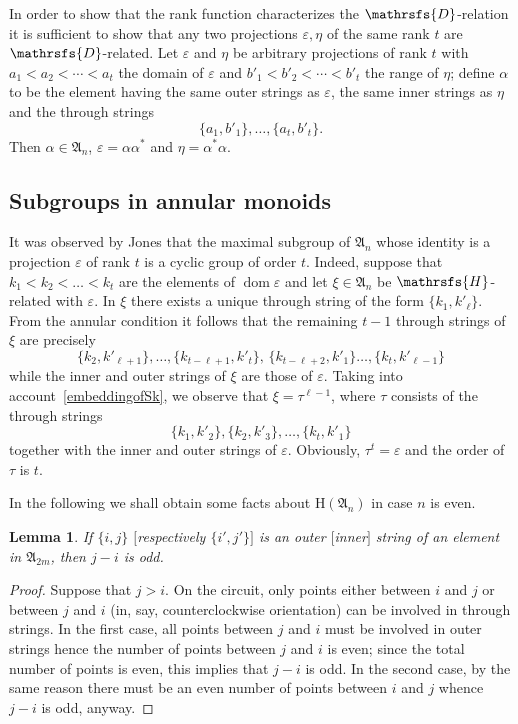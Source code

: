 \documentclass[11pt,reqno]{amsart}
\DeclareMathOperator{\dom}{dom} \DeclareMathOperator{\ran}{ran}
\numberwithin{equation}{section}
\newtheorem{Lemma}[Thm]{Lemma}
\theoremstyle{remark}
\def\Dc{\mathrsfs{D}}
\def\Hc{\mathrsfs{H}}
\def\al{\alpha}
\def\ep{\varepsilon}
\def\H{\mathrm H}
\def\A{\mathfrak{A}}
\begin{document}
In order to show that the rank function characterizes the
$\Dc$-relation it is sufficient to show that any two projections
$\ep, \eta$ of the same rank $t$ are $\Dc$-related. Let $\ep$ and
$\eta$ be arbitrary projections of rank $t$ with
$a_1<a_2<\cdots<a_t$  the domain of $\ep$ and
$b'_1<b'_2<\cdots<b'_t$ the range of $\eta$; define $\alpha$ to be
the element having the same outer strings as $\ep$, the same inner
strings as $\eta$ and the through strings
$$\{a_1,b'_1\},\dots,\{a_t,b'_t\}.$$
Then $\alpha\in \A_n$, $\ep=\al\al^*$ and $\eta=\al^*\al$.

\subsection{Subgroups in annular monoids}

It was observed by Jones \cite{jones} that the maximal subgroup of
$\A_n$ whose identity is a projection $\ep$ of rank $t$ is a
cyclic group of order $t$. Indeed, suppose that
$k_1<k_2<\dots<k_t$ are the elements of $\dom \ep$ and let $\xi\in
\A_n$ be $\Hc$-related with $\ep$. In $\xi$ there exists a unique
through string of the form $\{k_1,k'_\ell\}$. From the annular
condition it follows that the remaining $t-1$ through strings of
$\xi$ are precisely
$$\{k_2,k'_{\ell+1}\},\dots,\{k_{t-\ell+1},k'_t\},\,\{k_{t-\ell+2},k'_1\}\dots,
\{k_t,k'_{\ell-1}\}$$ while the inner and outer strings of $\xi$
are those of $\ep$. Taking into account~\eqref{embeddingofSk}, we
observe that $\xi=\tau^{\ell-1}$, where $\tau$ consists of the
through strings
$$\{k_1,k'_2\},\{k_2,k'_3\},\dots,\{k_t,k'_1\}$$
together with the inner and outer strings of $\ep$. Obviously,
 $\tau^t=\ep$ and the order of $\tau$ is $t$.

In the following we shall obtain some facts about $\H(\A_n)$ in
case $n$ is even.
\begin{Lemma}\label{differenceininnerstrings}
If $\{i,j\}$ $[$respectively $\{i',j'\}]$ is an outer $[$inner$]$
string of an element in $\A_{2m}$, then $j-i$ is odd.
\end{Lemma}
\begin{proof} Suppose that $j>i$. On the circuit, only points either between
$i$ and $j$ or between $j$ and $i$ (in, say, counterclockwise
orientation) can be involved in through strings. In the first
case, all points between $j$ and $i$ must be involved in outer
strings hence the number of points between $j$ and $i$ is even;
since the total number of points is even, this implies that $j-i$
is odd. In the second case, by the same reason there must be an
even number of points between $i$ and $j$ whence $j-i$ is odd,
anyway.
\end{proof}
\end{document}
